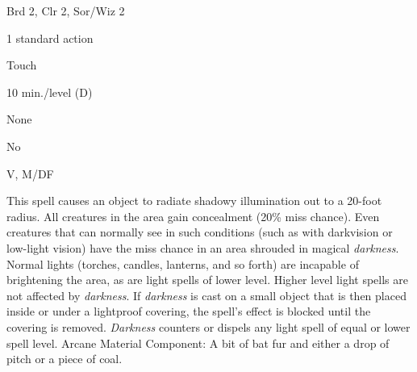 
\begin{description*}
\item[Level:] Brd 2, Clr 2, Sor/Wiz 2
\item[Casting Time:] 1 standard action
\item[Range:] Touch
\item[Duration:] 10 min./level (D)
\item[Saving Throw:] None
\item[Spell Resistance:] No
\item[Components:] V, M/DF
\end{description*}

This spell causes an object to radiate shadowy illumination out to a 20-foot radius.
All creatures in the area gain concealment (20\% miss chance). Even creatures that
can normally see in such conditions (such as with darkvision or low-light vision)
have the miss chance in an area shrouded in magical \textit{darkness}.
Normal lights (torches, candles, lanterns, and so forth) are incapable of brightening
the area, as are light spells of lower level. Higher level light spells are not
affected by \textit{darkness}.
If \textit{darkness} is cast on a small object that is then placed inside or under
a lightproof covering, the spell's effect is blocked until the covering is removed.
\textit{Darkness} counters or dispels any light spell of equal or lower spell level.
Arcane Material Component: A bit of bat fur and either a drop of pitch
or a piece of coal.